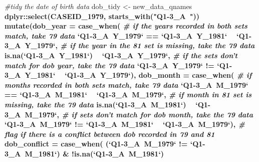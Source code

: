 \documentclass{article}
\newenvironment{Shaded}{\begin{snugshade}}{\end{snugshade}}
\newcommand{\CommentTok}[1]{\textcolor[rgb]{0.56,0.35,0.01}{\textit{#1}}}
\newcommand{\DataTypeTok}[1]{\textcolor[rgb]{0.13,0.29,0.53}{#1}}
\newcommand{\DecValTok}[1]{\textcolor[rgb]{0.00,0.00,0.81}{#1}}
\newcommand{\KeywordTok}[1]{\textcolor[rgb]{0.13,0.29,0.53}{\textbf{#1}}}
\newcommand{\NormalTok}[1]{#1}
\newcommand{\OperatorTok}[1]{\textcolor[rgb]{0.81,0.36,0.00}{\textbf{#1}}}
\newcommand{\StringTok}[1]{\textcolor[rgb]{0.31,0.60,0.02}{#1}}
\begin{document}
\begin{Shaded}
\begin{Highlighting}[]
\CommentTok{#tidy the date of birth data}
\NormalTok{dob_tidy <-}\StringTok{ }\NormalTok{new_data_qnames }\OperatorTok{%
\StringTok{  }\NormalTok{dplyr}\OperatorTok{::}\KeywordTok{select}\NormalTok{(CASEID_}\DecValTok{1979}\NormalTok{,}
                \KeywordTok{starts_with}\NormalTok{(}\StringTok{"Q1-3_A~"}\NormalTok{)) }\OperatorTok{%
\StringTok{  }\KeywordTok{mutate}\NormalTok{(}\DataTypeTok{dob_year =} \KeywordTok{case_when}\NormalTok{(}
    \CommentTok{# if the years recorded in both sets match, take 79 data}
    \StringTok{`}\DataTypeTok{Q1-3_A~Y_1979}\StringTok{`} \OperatorTok{==}\StringTok{ `}\DataTypeTok{Q1-3_A~Y_1981}\StringTok{`} \OperatorTok{~}\StringTok{ `}\DataTypeTok{Q1-3_A~Y_1979}\StringTok{`}\NormalTok{,}
    \CommentTok{# if the year in the 81 set is missing, take the 79 data}
    \KeywordTok{is.na}\NormalTok{(}\StringTok{`}\DataTypeTok{Q1-3_A~Y_1981}\StringTok{`}\NormalTok{) }\OperatorTok{~}\StringTok{ `}\DataTypeTok{Q1-3_A~Y_1979}\StringTok{`}\NormalTok{,}
    \CommentTok{# if the sets don't match for dob year, take the 79 data}
    \StringTok{`}\DataTypeTok{Q1-3_A~Y_1979}\StringTok{`} \OperatorTok{!=}\StringTok{ `}\DataTypeTok{Q1-3_A~Y_1981}\StringTok{`} \OperatorTok{~}\StringTok{ `}\DataTypeTok{Q1-3_A~Y_1979}\StringTok{`}\NormalTok{),}
    \DataTypeTok{dob_month =} \KeywordTok{case_when}\NormalTok{(}
      \CommentTok{# if months recorded in both sets match, take 79 data}
      \StringTok{`}\DataTypeTok{Q1-3_A~M_1979}\StringTok{`} \OperatorTok{==}\StringTok{ `}\DataTypeTok{Q1-3_A~M_1981}\StringTok{`} \OperatorTok{~}\StringTok{ `}\DataTypeTok{Q1-3_A~M_1979}\StringTok{`}\NormalTok{,}
      \CommentTok{# if month in 81 set is missing, take the 79 data}
      \KeywordTok{is.na}\NormalTok{(}\StringTok{`}\DataTypeTok{Q1-3_A~M_1981}\StringTok{`}\NormalTok{) }\OperatorTok{~}\StringTok{ `}\DataTypeTok{Q1-3_A~M_1979}\StringTok{`}\NormalTok{,}
      \CommentTok{# if sets don't match for dob month, take the 79 data}
      \StringTok{`}\DataTypeTok{Q1-3_A~M_1979}\StringTok{`} \OperatorTok{!=}\StringTok{ `}\DataTypeTok{Q1-3_A~M_1981}\StringTok{`} \OperatorTok{~}\StringTok{ `}\DataTypeTok{Q1-3_A~M_1979}\StringTok{`}\NormalTok{),}
    \CommentTok{# flag if there is a conflict between dob recorded in 79 and 81}
    \DataTypeTok{dob_conflict =} \KeywordTok{case_when}\NormalTok{(}
\NormalTok{      (}\StringTok{`}\DataTypeTok{Q1-3_A~M_1979}\StringTok{`} \OperatorTok{!=}\StringTok{ `}\DataTypeTok{Q1-3_A~M_1981}\StringTok{`}\NormalTok{) }\OperatorTok{&}\StringTok{ }\OperatorTok{!}\KeywordTok{is.na}\NormalTok{(}\StringTok{`}\DataTypeTok{Q1-3_A~M_1981}\StringTok{`}\NormalTok{)}
}}
\end{Highlighting}
\end{Shaded}
\end{document}
